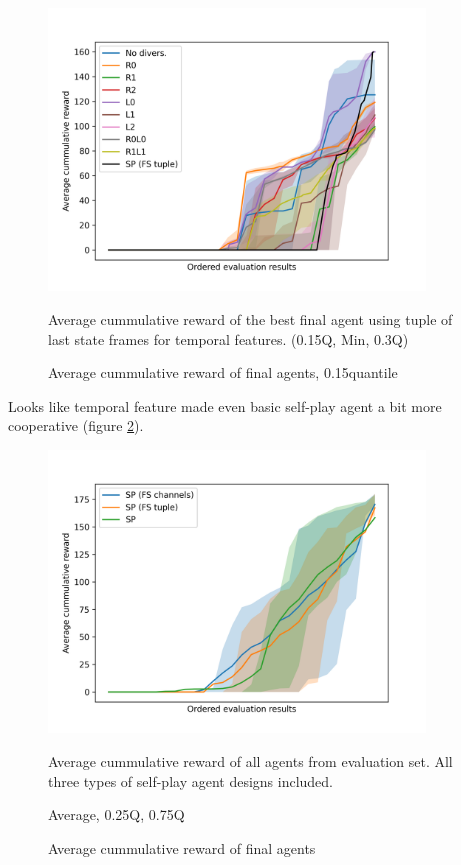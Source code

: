 \begin{figure}[!ht]
    \centering
    \includegraphics*[width=10cm]{../img/FSTupleOrderedQ15.png}

    \caption{Average cummulative reward of final agents, 0.15quantile}
    \label{FSTupleOrderedQ15}
    \medskip
    \small 
    Average cummulative reward of the best final agent using tuple of last state frames for temporal features.
    (0.15Q, Min, 0.3Q)

\end{figure}

Looks like temporal feature made even basic self-play agent a bit more cooperative (figure \ref{FSVariantsOrderedAvg}).

\begin{figure}[!ht]
    \centering
    \includegraphics*[width=10cm]{../img/FSVariantsOrderedAvg.png}

    \caption{Average cummulative reward of final agents}
    \label{FSVariantsOrderedAvg}
    \medskip
    \small 
    Average cummulative reward of all agents from evaluation set.
    All three types of self-play agent designs included.

    Average, 0.25Q, 0.75Q

\end{figure}


